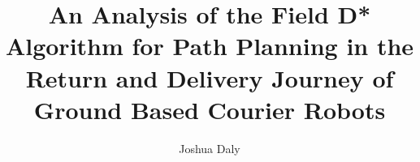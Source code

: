 \documentclass[12pt,ITBthesis]{report}
\newlength{\defbaselineskip}
\newcommand{\setlinespacing}[1]%
           {\setlength{\baselineskip}{#1 \defbaselineskip}}
\begin{document}
\setlinespacing{1.5}

\title{An Analysis of the Field D* Algorithm for Path Planning in the Return and Delivery Journey of Ground Based Courier Robots}

\author{Joshua Daly}



\address{Dublin, Ireland}


\submitdate{\today}





%


\setcounter{page}{1}

%
%

%
%
%
%

%
%

%
\end{document}
